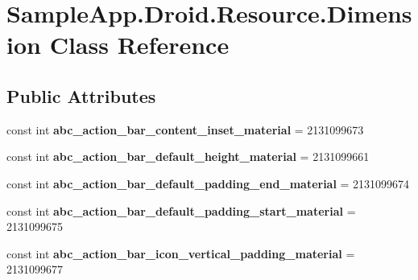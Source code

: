 \hypertarget{class_sample_app_1_1_droid_1_1_resource_1_1_dimension}{}\section{Sample\+App.\+Droid.\+Resource.\+Dimension Class Reference}
\label{class_sample_app_1_1_droid_1_1_resource_1_1_dimension}
\subsection*{Public Attributes}
\begin{DoxyCompactItemize}
\item 
\mbox{\label{class_sample_app_1_1_droid_1_1_resource_1_1_dimension_ab442b546db6ec469800325fba7f33310}} 
const int {\bfseries abc\+\_\+action\+\_\+bar\+\_\+content\+\_\+inset\+\_\+material} = 2131099673
\item 
\mbox{\label{class_sample_app_1_1_droid_1_1_resource_1_1_dimension_ae76452b0e9e2eae0aacb885e9e16a3b5}} 
const int {\bfseries abc\+\_\+action\+\_\+bar\+\_\+default\+\_\+height\+\_\+material} = 2131099661
\item 
\mbox{\label{class_sample_app_1_1_droid_1_1_resource_1_1_dimension_ac7b1f0082e93ccb2a338a98f22479cdb}} 
const int {\bfseries abc\+\_\+action\+\_\+bar\+\_\+default\+\_\+padding\+\_\+end\+\_\+material} = 2131099674
\item 
\mbox{\label{class_sample_app_1_1_droid_1_1_resource_1_1_dimension_a89dbdecd0b9f88ed625fd9295ca1797e}} 
const int {\bfseries abc\+\_\+action\+\_\+bar\+\_\+default\+\_\+padding\+\_\+start\+\_\+material} = 2131099675
\item 
\mbox{\label{class_sample_app_1_1_droid_1_1_resource_1_1_dimension_a9b5c75b0214bfa6f41a0a4d64ff64327}} 
const int {\bfseries abc\+\_\+action\+\_\+bar\+\_\+icon\+\_\+vertical\+\_\+padding\+\_\+material} = 2131099677
\item 
\mbox{\label{class_sample_app_1_1_droid_1_1_resource_1_1_dimension_a76e82164fbebe642cef2a9cb981eb345}} 

\end{DoxyCompactItemize}
